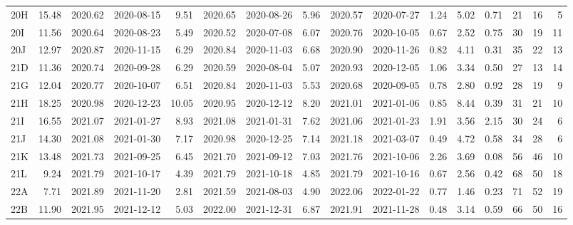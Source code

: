 \begin{tabular}{lrrlrrlrrlrrrrrr}
  20H &     15.48 &     2020.62 &      2020-08-15 &     9.51 &    2020.65 &     2020-08-26 &      5.96 &     2020.57 &      2020-07-27 &        1.24 &         5.02 &      0.71 &       21 &      16 &        5 \\
  20I &     11.56 &     2020.64 &      2020-08-23 &     5.49 &    2020.52 &     2020-07-08 &      6.07 &     2020.76 &      2020-10-05 &        0.67 &         2.52 &      0.75 &       30 &      19 &       11 \\
  20J &     12.97 &     2020.87 &      2020-11-15 &     6.29 &    2020.84 &     2020-11-03 &      6.68 &     2020.90 &      2020-11-26 &        0.82 &         4.11 &      0.31 &       35 &      22 &       13 \\
  21D &     11.36 &     2020.74 &      2020-09-28 &     6.29 &    2020.59 &     2020-08-04 &      5.07 &     2020.93 &      2020-12-05 &        1.06 &         3.34 &      0.50 &       27 &      13 &       14 \\
  21G &     12.04 &     2020.77 &      2020-10-07 &     6.51 &    2020.84 &     2020-11-03 &      5.53 &     2020.68 &      2020-09-05 &        0.78 &         2.80 &      0.92 &       28 &      19 &        9 \\
  21H &     18.25 &     2020.98 &      2020-12-23 &    10.05 &    2020.95 &     2020-12-12 &      8.20 &     2021.01 &      2021-01-06 &        0.85 &         8.44 &      0.39 &       31 &      21 &       10 \\
  21I &     16.55 &     2021.07 &      2021-01-27 &     8.93 &    2021.08 &     2021-01-31 &      7.62 &     2021.06 &      2021-01-23 &        1.91 &         3.56 &      2.15 &       30 &      24 &        6 \\
  21J &     14.30 &     2021.08 &      2021-01-30 &     7.17 &    2020.98 &     2020-12-25 &      7.14 &     2021.18 &      2021-03-07 &        0.49 &         4.72 &      0.58 &       34 &      28 &        6 \\
  21K &     13.48 &     2021.73 &      2021-09-25 &     6.45 &    2021.70 &     2021-09-12 &      7.03 &     2021.76 &      2021-10-06 &        2.26 &         3.69 &      0.08 &       56 &      46 &       10 \\
  21L &      9.24 &     2021.79 &      2021-10-17 &     4.39 &    2021.79 &     2021-10-18 &      4.85 &     2021.79 &      2021-10-16 &        0.67 &         2.56 &      0.42 &       68 &      50 &       18 \\
  22A &      7.71 &     2021.89 &      2021-11-20 &     2.81 &    2021.59 &     2021-08-03 &      4.90 &     2022.06 &      2022-01-22 &        0.77 &         1.46 &      0.23 &       71 &      52 &       19 \\
  22B &     11.90 &     2021.95 &      2021-12-12 &     5.03 &    2022.00 &     2021-12-31 &      6.87 &     2021.91 &      2021-11-28 &        0.48 &         3.14 &      0.59 &       66 &      50 &       16 \\
\bottomrule
\end{tabular}
